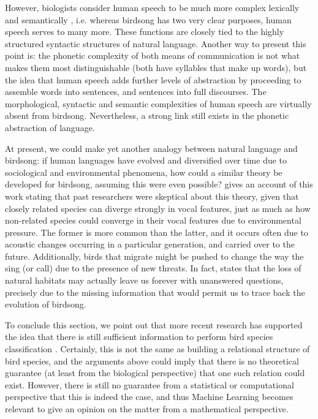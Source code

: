 \documentclass[../main.tex]{subfiles}
\begin{document}
\par However, biologists consider human speech to be much more complex lexically and semantically \cite{Berwick2013}, i.e. whereas birdsong has two very clear purposes, human speech serves to many more. These functions are closely tied to the highly structured syntactic structures of natural language. Another way to present this point is: the phonetic complexity of both means of communication is not what makes them most distinguishable (both have syllables that make up words), but the idea that human speech adds further levels of abstraction by proceeding to assemble words into sentences, and sentences into full discourses. The morphological, syntactic and semantic complexities of human speech are virtually absent from birdsong. Nevertheless, a strong link still exists in the phonetic abstraction of language.
\par At present, we could make yet another analogy between natural language and birdsong: if human languages have evolved and diversified over time due to sociological and environmental phenomena, how could a similar theory be developed for birdsong, assuming this were even possible? \cite{Cate2004} gives an account of this work stating that past researchers were skeptical about this theory, given that closely related species can diverge strongly in vocal features, just as much as how non-related species could converge in their vocal features due to environmental pressure. The former is more common than the latter, and it occurs often due to acoustic changes occurring in a particular generation, and carried over to the future. Additionally, birds that migrate might be pushed to change the way the sing (or call) due to the presence of new threats. In fact, \cite{Marler2004} states that the loss of natural habitats may actually leave us forever with unanswered questions, precisely due to the missing information that would permit us to trace back the evolution of birdsong.
\par To conclude this section, we point out that more recent research has supported the idea that there is still sufficient information to perform bird species classification \cite{Naguib2014}. Certainly, this is not the same as building a relational structure of bird species, and the arguments above could imply that there is no theoretical guarantee (at least from the biological perspective) that one such relation could exist. However, there is still no guarantee from a statistical or computational perspective that this is indeed the case, and thus Machine Learning becomes relevant to give an opinion on the matter from a mathematical perspective.
\end{document}
